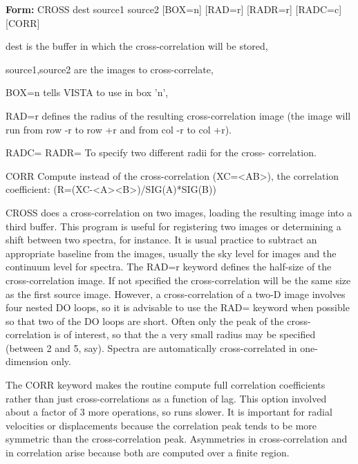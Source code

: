 \begin{command}
  \item[\textbf{Form: }CROSS dest source1 source2 {[BOX=n]} {[RAD=r]} {[RADR=r]} {[RADC=c]} {[CORR]}\hfill]{}
  \item[dest]{is the buffer in which the cross-correlation will be stored,}
  \item[source1,source2]{are the images to cross-correlate,}
  \item[BOX=n]{tells VISTA to use in box 'n',}
  \item[RAD=r]{defines the radius of the resulting cross-correlation image 
       (the image will run from row -r to row +r and from col -r to col +r).}
  \item[RADC= RADR=]{To specify two different radii for the cross-
       correlation.}
  \item[CORR]{Compute instead of the cross-correlation (XC=<AB>), 
              the correlation coefficient: (R=(XC-<A><B>)/SIG(A)*SIG(B))}
\end{command}

CROSS does a cross-correlation on two images, loading the resulting image
into a third buffer.  This program is useful for registering two images or
determining a shift between two spectra, for instance. It is usual practice
to subtract an appropriate baseline from the images, usually the sky level
for images and the continuum level for spectra. The RAD=r keyword defines
the half-size of the cross-correlation image. If not specified the
cross-correlation will be the same size as the first source image.
However, a cross-correlation of a two-D image involves four nested DO
loops, so it is advisable to use the RAD= keyword when possible so that two
of the DO loops are short.  Often only the peak of the cross-correlation is
of interest, so that the a very small radius may be specified (between 2
and 5, say).  Spectra are automatically cross-correlated in one-dimension
only.
 
The CORR keyword makes the routine compute full correlation coefficients
rather than just cross-correlations as a function of lag. This option
involved about a factor of 3 more operations, so runs slower. It is
important for radial velocities or displacements because the correlation
peak tends to be more symmetric than the cross-correlation
peak. Asymmetries in cross-correlation and in correlation arise because
both are computed over a finite region.

